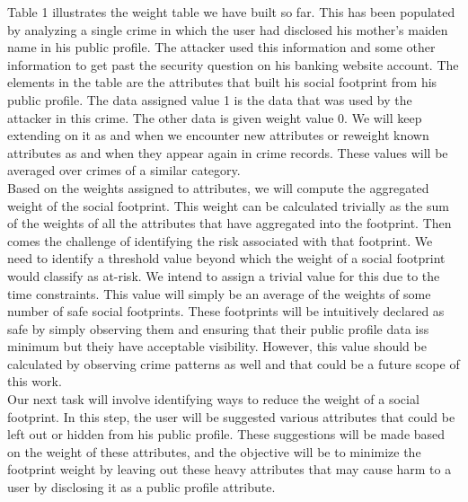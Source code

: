 \documentclass[12pt,conference]{IEEEtran}
\begin{document}
Table 1 illustrates the weight table we have built so far. This has been populated by analyzing a single crime in which the user had disclosed his mother's maiden name in his public profile. The attacker used this information and some other information to get past the security question on his banking website account. The elements in the table are the attributes that built his social footprint from his public profile. The data assigned value 1 is the data that was used by the attacker in this crime. The other data is given weight value 0. We will keep extending on it as and when we encounter new attributes or reweight known attributes as and when they appear again in crime records. These values will be averaged over crimes of a similar category.\\

Based on the weights assigned to attributes, we will compute the aggregated weight of the social footprint. This weight can be calculated trivially as the sum of the weights of all the attributes that have aggregated into the footprint. Then comes the challenge of identifying the risk associated with that footprint. We need to identify a threshold value beyond which the weight of a social footprint would classify as at-risk. We intend to assign a trivial value for this due to the time constraints. This value will simply be an average of the weights of some number of safe social footprints. These footprints will be intuitively declared as safe by simply observing them and ensuring that their public profile data iss minimum but theiy have acceptable visibility. However, this value should be calculated by observing crime patterns as well and that could be a future scope of this work.\\

Our next task will involve identifying ways to reduce the weight of a social footprint. In this step, the user will be suggested various attributes that could be left out or hidden from his public profile. These suggestions will be made based on the weight of these attributes, and the objective will be to minimize the footprint weight by leaving out these heavy attributes that may cause harm to a user by disclosing it as a public profile attribute.

\end{document}

